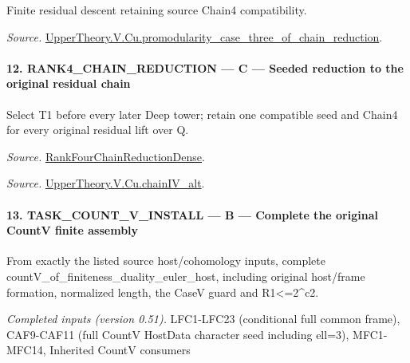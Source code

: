\documentclass[11pt,a4paper]{article}
\numberwithin{equation}{section}
\theoremstyle{remark}\newtheorem{remark}[theorem]{Remark}
\begin{document}
Finite residual descent retaining source Chain4 compatibility.

\emph{Source.} \href{https://github.com/CocoSgt/riemann-hypothesis-lean/blob/7cbf7a0c32fca1badf05931879a37c3f8a2b03b4/src/Development/AutomorphicArithmetic/AutomorphicVarieties/ModularityArgument/ThresholdArguments/DenseThresholdCases/PromodularityCaseThreeOfLemmas.lean#L131-L153}{UpperTheory.V.Cu.promodularity\_\allowbreak case\_\allowbreak three\_\allowbreak of\_\allowbreak chain\_\allowbreak reduction}.



\paragraph{12. RANK4\_\allowbreak CHAIN\_\allowbreak REDUCTION — C — Seeded reduction to the original residual chain}

Select T1 before every later Deep tower; retain one compatible seed and Chain4 for every original residual lift over Q.

\emph{Source.} \href{https://github.com/CocoSgt/riemann-hypothesis-lean/blob/7cbf7a0c32fca1badf05931879a37c3f8a2b03b4/src/Development/AutomorphicArithmetic/AutomorphicVarieties/ModularityArgument/ThresholdArguments/DenseThresholdCases/PromodularityCaseThree.lean#L33-L39}{RankFourChainReductionDense}.

\emph{Source.} \href{https://github.com/CocoSgt/riemann-hypothesis-lean/blob/7cbf7a0c32fca1badf05931879a37c3f8a2b03b4/src/Development/AutomorphicArithmetic/AutomorphicVarieties/ModularityArgument/ThresholdArguments/DenseThresholdCases/CuPChainIV.lean#L16-L82}{UpperTheory.V.Cu.chainIV\_\allowbreak alt}.



\paragraph{13. TASK\_\allowbreak COUNT\_\allowbreak V\_\allowbreak INSTALL — B — Complete the original CountV finite assembly}

From exactly the listed source host/cohomology inputs, complete countV\_\allowbreak of\_\allowbreak finiteness\_\allowbreak duality\_\allowbreak euler\_\allowbreak host, including original host/frame formation, normalized length, the CaseV guard and R1<=2\textasciicircum{}c2.

\emph{Completed inputs (version 0.51).} LFC1-LFC23 (conditional full common frame), CAF9-CAF11 (full CountV HostData character seed including ell=3), MFC1-MFC14, Inherited CountV consumers
\end{document}
